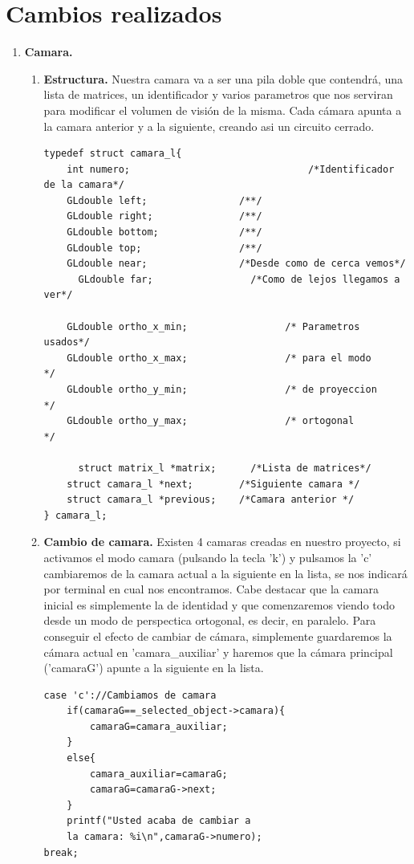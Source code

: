 \documentclass[12pt,a4paper]{article}
\begin{document}
\section{Cambios realizados}

\begin{enumerate}
\item \textbf{Camara.}\newline

\begin{enumerate}
\item \textbf{Estructura.}
Nuestra camara va a ser una pila doble que contendrá, una lista de matrices, un identificador y varios parametros que nos serviran para modificar el volumen de visión de la misma.\newline
Cada cámara apunta a la camara anterior y a la siguiente, creando asi un circuito cerrado.\newline
\begin{lstlisting}
typedef struct camara_l{
    int numero;							      /*Identificador de la camara*/
    GLdouble left;                /**/
    GLdouble right;               /**/
    GLdouble bottom;              /**/
    GLdouble top;                 /**/
    GLdouble near;                /*Desde como de cerca vemos*/
	  GLdouble far;                 /*Como de lejos llegamos a ver*/

  	GLdouble ortho_x_min;				  /* Parametros usados*/
  	GLdouble ortho_x_max;				  /* para el modo     */
  	GLdouble ortho_y_min;				  /* de proyeccion    */
  	GLdouble ortho_y_max;				  /* ortogonal        */

	  struct matrix_l *matrix;      /*Lista de matrices*/
    struct camara_l *next;        /*Siguiente camara */
    struct camara_l *previous;    /*Camara anterior */
} camara_l;
\end{lstlisting}

\item \textbf{Cambio de camara.}
Existen 4 camaras creadas en nuestro proyecto, si activamos el modo camara (pulsando la tecla 'k') y pulsamos la 'c' cambiaremos de la camara actual a la siguiente en la lista, se nos indicará por terminal en cual nos encontramos.\newline
Cabe destacar que la camara inicial es simplemente la de identidad y que comenzaremos viendo todo desde un modo de perspectica ortogonal, es decir, en paralelo.\newline
Para conseguir el efecto de cambiar de cámara, simplemente guardaremos la cámara actual en 'camara\_auxiliar' y haremos que la cámara principal ('camaraG') apunte a la siguiente en la lista.
\begin{lstlisting}
case 'c'://Cambiamos de camara
	if(camaraG==_selected_object->camara){
		camaraG=camara_auxiliar;
	}     
	else{
		camara_auxiliar=camaraG;
		camaraG=camaraG->next;
	}
    printf("Usted acaba de cambiar a 
    la camara: %i\n",camaraG->numero);
break;
\end{lstlisting}



\end{enumerate}
\end{enumerate}
\end{document}
